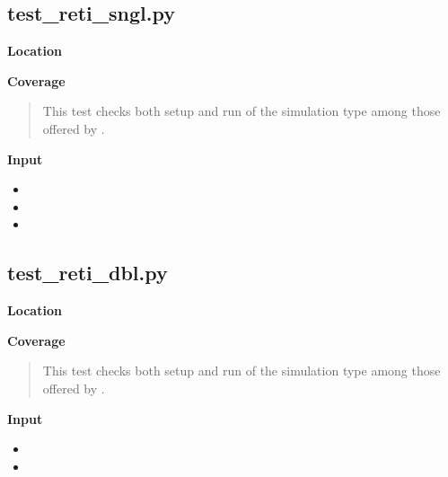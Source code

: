 \documentclass[letterpaper,10pt,english]{sphinxmanual}
\begin{document}
\subsection{test\_reti\_sngl.py}
\label{testsuite:test-reti-sngl-py}
\textbf{Location}
\begin{quote}

\end{quote}

\textbf{Coverage}
\begin{quote}

This test checks both setup and run of the  simulation type among those offered by .
\end{quote}

\textbf{Input}
\begin{itemize}
\item {} 

\item {} 

\item {} 

\end{itemize}


\subsection{test\_reti\_dbl.py}
\label{testsuite:test-reti-dbl-py}
\textbf{Location}
\begin{quote}

\end{quote}

\textbf{Coverage}
\begin{quote}

This test checks both setup and run of the  simulation type among those offered by .
\end{quote}

\textbf{Input}
\begin{itemize}
\item {} 

\item {} 

\end{itemize}



\renewcommand{\indexname}{Index}
\printindex
\end{document}
